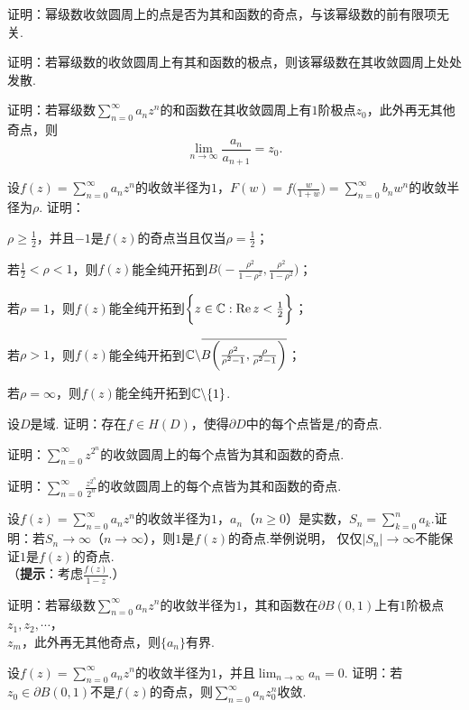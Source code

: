 \begin{xiti}
  \item 证明：幂级数收敛圆周上的点是否为其和函数的奇点，与该幂级数的前有限项无关.
  \item 证明：若幂级数的收敛圆周上有其和函数的极点，则该幂级数在其收敛圆周上处处发散.
  \item 证明：若幂级数$\sum_{n=0}^\infty a_nz^n$的和函数在其收敛圆周上有$1$阶极点$z_0$，此外再无其他奇点，则
        \[
          \lim_{n\to\infty}\frac{a_n}{a_{n+1}} = z_0.
        \]
  \item 设$f(z)=\sum_{n=0}^\infty a_nz^n$的收敛半径为$1$，$F(w)=f\bigg(\frac w{1+w}\bigg)=\sum_{n=0}^\infty b_nw^n$的收敛半径为$\rho$. 证明：
      \begin{enuma}
        \item $\rho\ge\frac12$，并且$-1$是$f(z)$的奇点当且仅当$\rho=\frac12$；
        \item 若$\frac12<\rho<1$，则$f(z)$能全纯开拓到$B\bigg(-\frac{\rho^2}{1-\rho^2},\frac{\rho^2}{1-\rho^2}\bigg)$；
        \item 若$\rho=1$，则$f(z)$能全纯开拓到$\bigg\{z\in\mathbb C:\operatorname{Re} z<\frac12\bigg\}$；
        \item 若$\rho>1$，则$f(z)$能全纯开拓到$\mathbb C\backslash{}\mkern1mu\overline{\mkern-1muB\bigg(\frac{\rho^2} {\rho^2-1},\frac{\rho}{\rho^2-1}\bigg)}$；
        \item 若$\rho=\infty$，则$f(z)$能全纯开拓到$\mathbb C\backslash\{1\}$.
      \end{enuma}
  \item 设$D$是域. 证明：存在$f\in H(D)$，使得$\partial D$中的每个点皆是$f$的奇点.
  \item 证明：$\sum_{n=0}^\infty z^{2^n}$的收敛圆周上的每个点皆为其和函数的奇点.
  \item 证明：$\sum_{n=0}^\infty \frac{z^{2^n}}{2^n}$的收敛圆周上的每个点皆为其和函数的奇点.
  \item 设$f(z)=\sum_{n=0}^\infty a_nz^n$的收敛半径为$1$，$a_n$（$n\ge0$）是实数，$S_n=\sum_{k=0}^na_k $.证明：若$S_n\to\infty$（$n\to\infty$），则$1$是$f(z)$的奇点.举例说明，
        仅仅$|S_n|\to\infty$不能保证$1$是$f(z)$的奇点.\\
       （\textbf{提示}：考虑$\frac{f(z)}{1-z}$.）
  \item 证明：若幂级数$\sum_{n=0}^\infty a_nz^n$的收敛半径为$1$，其和函数在$\partial B(0,1)$上有$1$阶极点$z_1,z_2,\cdots$，\\$z_m$，此外再无其他奇点，则$\{a_n\}$有界.
  \item 设$f(z)=\sum_{n=0}^\infty a_nz^n$的收敛半径为$1$，并且$\lim_{n\to\infty}a_n=0$. 证明：若$z_0\in\partial B(0,1)$不是$f(z)$的奇点，则$\sum_{n=0}^\infty a_nz_0^n$收敛.
\end{xiti}

